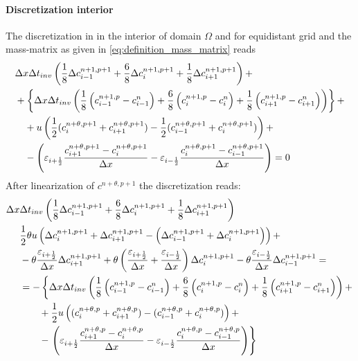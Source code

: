 \paragraph*{Discretization interior}
The discretization in \deltaformulation in the interior of domain $\Omega$ and
for equidistant grid and the mass-matrix as given in \autoref{eq:definition_mass_matrix} reads
\begin{align}
    & \Delta x \Delta t_{inv} \left(\frac{1}{8} \Delta c^{n+1,p+1}_{i-1} + \frac{6}{8} \Delta c^{n+1,p+1}_{i} + \frac{1}{8} \Delta c^{n+1,p+1}_{i+1}\right)  +
    \nonumber \\*
    &
    + \left\{ \Delta x \Delta t_{inv} \left( \frac{1}{8}\left( c^{n+1,p}_{i-1} - c^{n}_{i-1} \right) + \frac{6}{8}\left( c^{n+1,p}_{i} - c^{n}_{i} \right) + \frac{1}{8}\left( c^{n+1,p}_{i+1} - c^{n}_{i+1} \right) \right)  \right\} +
    \nonumber \\*
    &\quad  +  u \left( \frac{1}{2} (c^{n+\theta, p+1}_{i} + c^{n+\theta,p+1}_{i+1}) -  \frac{1}{2} (c^{n+\theta, p+1}_{i-1} +c^{n+\theta,p+1}_{i}) \right) +
    \nonumber \\*
    &\quad - \left( \varepsilon_{i+\frac{1}{2}} \frac{c^{n+\theta, p+1}_{i+1} - c^{n+\theta, p+1}_{i}}{\Delta x} - \varepsilon_{i-\frac{1}{2}} \frac{c^{n+\theta, p+1}_{i} - c^{n+\theta, p+1}_{i-1}}{\Delta x}\right) = 0
\end{align}
After linearization of $c^{n+\theta,p+1}$ the discretization reads:
\begin{align}
    \Delta x & \Delta t_{inv}  \left(\frac{1}{8} \Delta c^{n+1,p+1}_{i-1} + \frac{6}{8} \Delta c^{n+1,p+1}_{i} + \frac{1}{8} \Delta c^{n+1,p+1}_{i+1}\right)
    \nonumber \\*
    & \frac{1}{2} \theta u \left(  \Delta c^{n+1,p+1}_{i} + \Delta c^{n+1,p+1}_{i+1} - \left( \Delta c^{n+1,p+1}_{i-1} + \Delta c^{n+1,p+1}_{i}  \right)\right) +
    \nonumber \\*
    & - \theta \frac{\varepsilon_{i+\frac{1}{2}}}{\Delta x} \Delta c^{n+1, p+1}_{i+1}
    + \theta \left( \frac{\varepsilon_{i+\frac{1}{2}}}{\Delta x} + \frac{\varepsilon_{i-\frac{1}{2}}}{\Delta x} \right) \Delta c^{n+1, p+1}_{i} - \theta \frac{\varepsilon_{i-\frac{1}{2}}}{\Delta x} \Delta c^{n+1, p+1}_{i-1}
    =
    \nonumber \\*
    & = -\left\{ \Delta x \Delta t_{inv} \left( \frac{1}{8}\left( c^{n+1,p}_{i-1} - c^{n}_{i-1} \right) + \frac{6}{8}\left( c^{n+1,p}_{i} - c^{n}_{i} \right) + \frac{1}{8}\left( c^{n+1,p}_{i+1} - c^{n}_{i+1} \right)\right) + \right.
    \nonumber \\*
    & \qquad + \frac{1}{2} u \left((c^{n+\theta, p}_{i} + c^{n+\theta,p}_{i+1}) -  (c^{n+\theta, p}_{i-1} +c^{n+\theta,p}_{i}) \right) +
    \nonumber \\*
    &\qquad - \left. \left( \varepsilon_{i+\frac{1}{2}} \frac{c^{n+\theta,p}_{i+1} - c^{n+\theta,p}_{i}}{\Delta x} - \varepsilon_{i-\frac{1}{2}} \frac{c^{n+\theta,p}_{i} - c^{n+\theta,p}_{i-1}}{\Delta x}\right) \right\}
\end{align}

